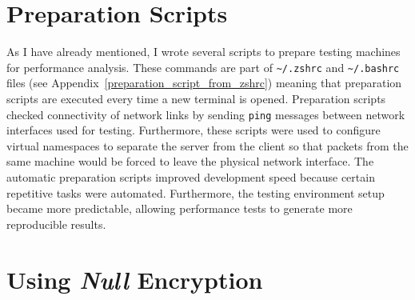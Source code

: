 \documentclass[12pt,a4paper,twoside,openright]{report}
\newcommand\note[2]{{\color{#1}\bf #2}}
\newcommand\simon[1]{\ifcomments{\note{cyan}{SM: #1}}\fi}
\begin{document}





















\section{Preparation Scripts}
As I have already mentioned, I wrote several scripts to prepare testing machines for performance analysis.
These commands are part of \texttt{\textasciitilde/.zshrc} and \texttt{\textasciitilde/.bashrc} files (see Appendix~\ref{preparation_script_from_zshrc}) meaning that preparation scripts are executed every time a new terminal is opened.
Preparation scripts checked connectivity of network links by sending \texttt{ping} messages between network interfaces used for testing.
Furthermore, these scripts were used to configure virtual namespaces to separate the server from the client so that packets from the same machine would be forced to leave the physical network interface.
The automatic preparation scripts improved development speed because certain repetitive tasks were automated.
Furthermore, the testing environment setup became more predictable, allowing performance tests to generate more reproducible results.

















\section{Using \textit{Null} Encryption}
\end{document}
